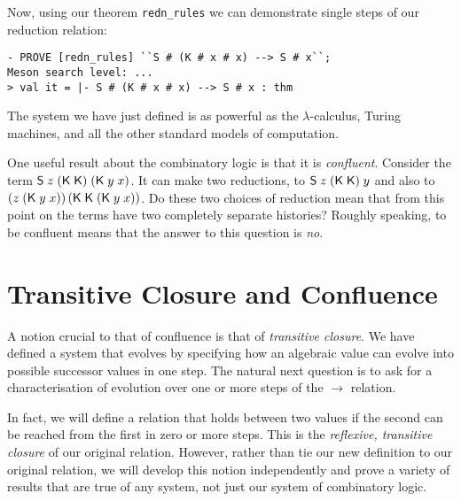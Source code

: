 \documentclass[12pt]{article}
\newcommand{\KC}{\con{K}}
\newcommand{\SC}{\con{S}}
\begin{document}
Now, using our theorem \texttt{redn\_rules} we can demonstrate single
steps of our reduction relation:
\begin{session}\begin{verbatim}
- PROVE [redn_rules] ``S # (K # x # x) --> S # x``;
Meson search level: ...
> val it = |- S # (K # x # x) --> S # x : thm
\end{verbatim}\end{session}
    The system we have just defined is as powerful as the
    $\lambda$-calculus, Turing machines, and all the other standard
    models of computation.

    One useful result about the combinatory logic is that it is
    \emph{confluent}.  Consider the term $\SC\;z\;(\KC\;\KC)\;(\KC\;
    y\; x)$.  It can make two reductions, to $\SC\;z\;(\KC\;\KC)\;y$
    and also to $(z\;(\KC\;y\;x))\,(\KC\;\KC\;(\KC\;y\;x))$.  Do these
    two choices of reduction mean that from this point on the terms
    have two completely separate histories?  Roughly speaking, to be
    confluent means that the answer to this question is \emph{no}.


\section{Transitive Closure and Confluence}
\label{sec:Transitive-Clos-Conf}

A notion crucial to that of confluence is that of \emph{transitive
  closure}.  We have defined a system that evolves by specifying how
an algebraic value can evolve into possible successor values in one
step.  The natural next question is to ask for a characterisation of
evolution over one or more steps of the $\rightarrow$ relation.

In fact, we will define a relation that holds between two values if
the second can be reached from the first in zero or more steps.  This
is the \emph{reflexive, transitive closure} of our original relation.
However, rather than tie our new definition to our original relation,
we will develop this notion independently and prove a variety of
results that are true of any system, not just our system of
combinatory logic.
\end{document}
